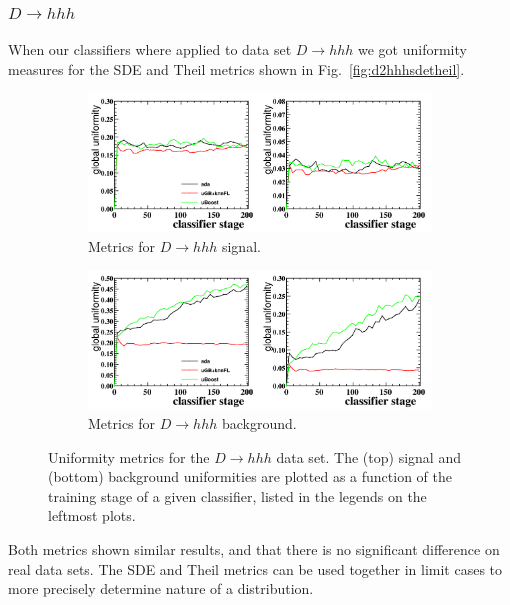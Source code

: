 \subsubsection{$D \to hhh$}
When our classifiers where applied to data set $D \to hhh$ we got uniformity measures for the SDE and Theil
metrics shown in Fig.~\ref{fig:d2hhhsdetheil}.
\begin{figure}[H]
\label{fig:d2hhhsdetheil}
\centering
		\begin{subfigure}[b]{0.95\textwidth}
			\includegraphics[width=\textwidth]{graphs/D23hSignalEffs.png}
			\caption{Metrics for $D \to hhh$ signal.}
		\end{subfigure}
		\begin{subfigure}[b]{0.95\textwidth}
			\includegraphics[width=\textwidth]{graphs/D23hBgEffs.png}
			\caption{Metrics for $D \to hhh$ background.}
		\end{subfigure}
		\caption{Uniformity metrics for the $D \to hhh$ data set. The (top) signal and (bottom) background uniformities are plotted as a function of the training stage of a given classifier, listed in the legends on the leftmost plots.}
\end{figure}

Both metrics shown similar results, and that there is no significant difference on real data sets.
The SDE and Theil metrics can be used together in limit cases to more precisely determine nature of a distribution.
